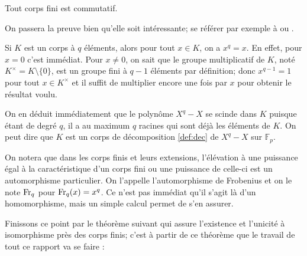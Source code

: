\documentclass[a4paper]{article} %
\numberwithin{section}{part}
\numberwithin{equation}{section}
\newcommand\GF[1]{\mathbb{F}_{#1}}
\begin{document}
\begin{thm}[Wedderburn]
Tout corps fini est commutatif.
\end{thm}
On passera la preuve bien qu'elle soit intéressante; se référer par exemple à 
\cite[p.~70-73]{LiNi1} ou \cite[p.~82]{Per}.\par
\vspace{0.3cm}
Si $K$ est un corps à $q$ éléments, alors pour tout $x\in K$, on a $x^q = x$. En
effet, pour $x = 0$ c'est immédiat. Pour $x\neq 0$, on sait que le groupe
multiplicatif de $K$, noté $K^{\times} = K\setminus\lbrace0\rbrace$, est un
groupe fini à $q-1$ éléments par définition; donc $x^{q-1} = 1$ pour tout $x\in
K^{\times}$ et il suffit de multiplier encore une fois par $x$ pour obtenir le
résultat voulu.\par
On en déduit immédiatement que le polynôme $X^q - X$ se scinde dans $K$
puisque étant de degré $q$, il a au maximum $q$ racines qui sont déjà les
éléments de $K$. On peut dire que $K$ est un corps de décomposition
\ref{def:dec} de $X^q - X$ sur $\GF{p}$.\par
On notera que dans les corps finis et leurs extensions, l'élévation à une
puissance égal à la caractéristique d'un corps fini ou une puissance de celle-ci
est un automorphisme particulier. On l'appelle l'automorphisme de Frobenius et 
on le note $\textup{Fr}_q$ pour $\textup{Fr}_q(x) = x^q$. Ce n'est pas immédiat
qu'il s'agit là d'un homomorphisme, mais un simple calcul permet de s'en 
assurer.\par
\vspace{0.3cm}
Finissons ce point par le théorème suivant qui assure l'existence et l'unicité
à isomorphisme près des corps finis; c'est à partir de ce théorème que le
travail de tout ce rapport va se faire :
\end{document}
